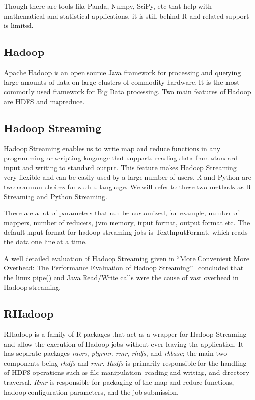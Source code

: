 \documentclass[
journal=jacsat, %
manuscript=article]{achemso}
\begin{document}
Though there are tools like Panda, Numpy, SciPy, etc that help with mathematical and statistical applications, it is still behind R and related support is limited.

\subsection{Hadoop}
Apache Hadoop is an open source Java framework for processing and querying large amounts of data on large clusters of commodity hardware. It is the most commonly used framework for Big Data processing. Two main features of Hadoop are HDFS and mapreduce. 

\subsection{Hadoop Streaming}
Hadoop Streaming enables us to write map and reduce functions in any programming or scripting language that supports reading data from standard input and writing to standard output. This feature makes Hadoop Streaming very flexible and can be easily used by a large number of users. R and Python are two common choices for such a language. We will refer to these two methods as R Streaming and Python Streaming.

There are a lot of parameters that can be customized, for example, number of mappers, number of reducers, jvm memory, input format, output format etc. The default input format for hadoop streaming jobs is TextInputFormat, which reads the data one line at a time.~\cite{Apache}

A well detailed evaluation of Hadoop Streaming given in “More Convenient More Overhead: The Performance Evaluation of Hadoop Streaming”~\cite{Overhead} concluded that the linux pipe() and Java Read/Write calls were the cause of vast overhead in Hadoop streaming. 

\subsection{RHadoop}
RHadoop is a family of R packages that act as a wrapper for Hadoop Streaming and allow the execution of Hadoop jobs without ever leaving the application. It has separate packages \textit{ravro}, \textit{plyrmr}, \textit{rmr}, \textit{rhdfs}, and \textit{rhbase}; the main two components being \textit{rhdfs} and \textit{rmr}. \textit{Rhdfs} is primarily responsible for the handling of HDFS operations such as file manipulation, reading and writing, and directory traversal. \textit{Rmr} is responsible for packaging of the map and reduce functions, hadoop configuration parameters, and the job submission. 
\end{document}
